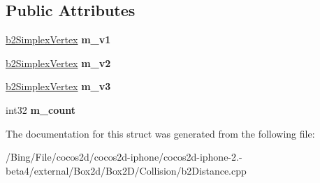 \subsection*{Public Attributes}
\begin{DoxyCompactItemize}
\item 
\hypertarget{structb2_simplex_a974d030fe572112e6d5212520586eb13}{\hyperlink{structb2_simplex_vertex}{b2\-Simplex\-Vertex} {\bfseries m\-\_\-v1}}\label{structb2_simplex_a974d030fe572112e6d5212520586eb13}

\item 
\hypertarget{structb2_simplex_a1732c0f9d63e7cdbd405e7a7b2c7b7cb}{\hyperlink{structb2_simplex_vertex}{b2\-Simplex\-Vertex} {\bfseries m\-\_\-v2}}\label{structb2_simplex_a1732c0f9d63e7cdbd405e7a7b2c7b7cb}

\item 
\hypertarget{structb2_simplex_a42ede9ec641aea34e51baf1b43e9ea07}{\hyperlink{structb2_simplex_vertex}{b2\-Simplex\-Vertex} {\bfseries m\-\_\-v3}}\label{structb2_simplex_a42ede9ec641aea34e51baf1b43e9ea07}

\item 
\hypertarget{structb2_simplex_ad11c352a25ee324f438515fb8028bd23}{int32 {\bfseries m\-\_\-count}}\label{structb2_simplex_ad11c352a25ee324f438515fb8028bd23}

\end{DoxyCompactItemize}


The documentation for this struct was generated from the following file\-:\begin{DoxyCompactItemize}
\item 
/\-Bing/\-File/cocos2d/cocos2d-\/iphone/cocos2d-\/iphone-\/2.-\/beta4/external/\-Box2d/\-Box2\-D/\-Collision/b2\-Distance.\-cpp\end{DoxyCompactItemize}
